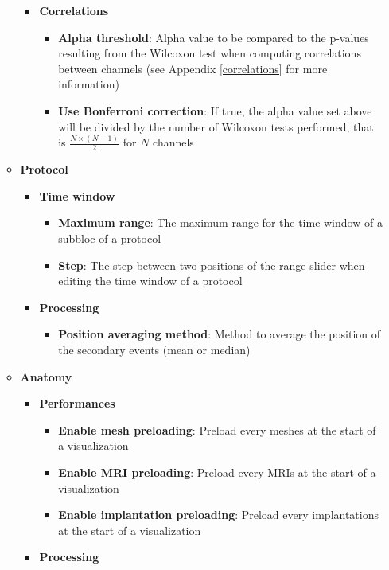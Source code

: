 \documentclass[a4paper]{article}
\begin{document}
\begin{itemize}
\begin{itemize}
\begin{itemize}
\begin{itemize}
\end{itemize}
\item \textbf{Correlations}
\begin{itemize}
\item \textbf{Alpha threshold}: Alpha value to be compared to the p-values resulting from the Wilcoxon test when computing correlations between channels (see Appendix \ref{correlations} for more information)
\item \textbf{Use Bonferroni correction}: If true, the alpha value set above will be divided by the number of Wilcoxon tests performed, that is $\frac{N \times (N - 1)}{2}$ for $N$ channels
\end{itemize}
\end{itemize}
\item \textbf{Protocol}
\begin{itemize}
\item \textbf{Time window}
\begin{itemize}
\item \textbf{Maximum range}: The maximum range for the time window of a subbloc of a protocol
\item \textbf{Step}: The step between two positions of the range slider when editing the time window of a protocol
\end{itemize}
\end{itemize}
\begin{itemize}
\item \textbf{Processing}
\begin{itemize}
\item \textbf{Position averaging method}: Method to average the position of the secondary events (mean or median)
\end{itemize}
\end{itemize}
\item \textbf{Anatomy}
\begin{itemize}
\item \textbf{Performances}
\begin{itemize}
\item \textbf{Enable mesh preloading}: Preload every meshes at the start of a visualization
\item \textbf{Enable MRI preloading}: Preload every MRIs at the start of a visualization
\item \textbf{Enable implantation preloading}: Preload every implantations at the start of a visualization
\end{itemize}
\item \textbf{Processing}

\end{itemize}
\end{itemize}
\end{itemize}
\end{document}
